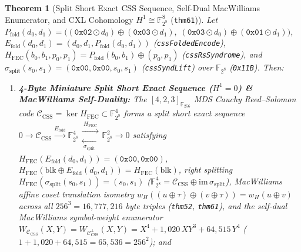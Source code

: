 \documentclass[11pt,letterpaper]{article}
\theoremstyle{spectralthm}
\newtheorem{theorem}{Theorem}[section]
\begin{document}
\begin{theorem}[Split Short Exact CSS Sequence, Self-Dual MacWilliams Enumerator, and CXL Cohomology $H^1 \cong \mathbb{F}_{2^8}^8$ (\texttt{thm61})]
\label{thm:split_exact_macwilliams}
Let $P_{\mathrm{fold}}(d_0, d_1) = \bigl((\texttt{0x02}\odot d_0)\oplus(\texttt{0x03}\odot d_1),\; (\texttt{0x03}\odot d_0)\oplus(\texttt{0x01}\odot d_1)\bigr)$, $E_{\mathrm{fold}}(d_0, d_1) = (d_0, d_1, P_{\mathrm{fold}}(d_0, d_1))$ (\texttt{cssFoldedEncode}), $H_{\mathrm{FEC}}(b_0, b_1, p_0, p_1) = P_{\mathrm{fold}}(b_0, b_1) \oplus (p_0, p_1)$ (\texttt{cssRsSyndrome}), and $\sigma_{\mathrm{split}}(s_0, s_1) = (\texttt{0x00}, \texttt{0x00}, s_0, s_1)$ (\texttt{cssSyndLift}) over $\mathbb{F}_{2^8}$ (\texttt{0x11B}). Then:
\begin{enumerate}
\item \textbf{4-Byte Miniature Split Short Exact Sequence ($H^1 = 0$) \& MacWilliams Self-Duality:} The $[4,2,3]_{\mathbb{F}_{256}}$ MDS Cauchy Reed--Solomon code $\mathcal{C}_{\mathrm{CSS}} = \ker H_{\mathrm{FEC}} \subset \mathbb{F}_{2^8}^4$ forms a split short exact sequence $0 \to \mathcal{C}_{\mathrm{CSS}} \xrightarrow{E_{\mathrm{fold}}} \mathbb{F}_{2^8}^4 \mathrel{\substack{\xrightarrow{\;H_{\mathrm{FEC}}\;} \\ \xleftarrow[\;\sigma_{\mathrm{split}}\;]{}}} \mathbb{F}_{2^8}^2 \to 0$ satisfying $H_{\mathrm{FEC}}(E_{\mathrm{fold}}(d_0, d_1)) = (\texttt{0x00}, \texttt{0x00})$, $H_{\mathrm{FEC}}(\mathrm{blk} \oplus E_{\mathrm{fold}}(d_0, d_1)) = H_{\mathrm{FEC}}(\mathrm{blk})$, right splitting $H_{\mathrm{FEC}}(\sigma_{\mathrm{split}}(s_0, s_1)) = (s_0, s_1)$ ($\mathbb{F}_{2^8}^4 = \mathcal{C}_{\mathrm{CSS}} \oplus \mathrm{im}\,\sigma_{\mathrm{split}}$), MacWilliams affine coset translation isometry $w_H((u \oplus \tau) \oplus (v \oplus \tau)) = w_H(u \oplus v)$ across all $256^3 = 16{,}777{,}216$ byte triples (\texttt{thm52}, \texttt{thm61}), and the self-dual MacWilliams symbol-weight enumerator $W_{\mathcal{C}_{\mathrm{CSS}}}(X, Y) = W_{\mathcal{C}_{\mathrm{CSS}}^\perp}(X, Y) = X^4 + 1{,}020\,X Y^3 + 64{,}515\,Y^4$ ($1 + 1{,}020 + 64{,}515 = 65{,}536 = 256^2$); and

\end{enumerate}
\end{theorem}
\end{document}
